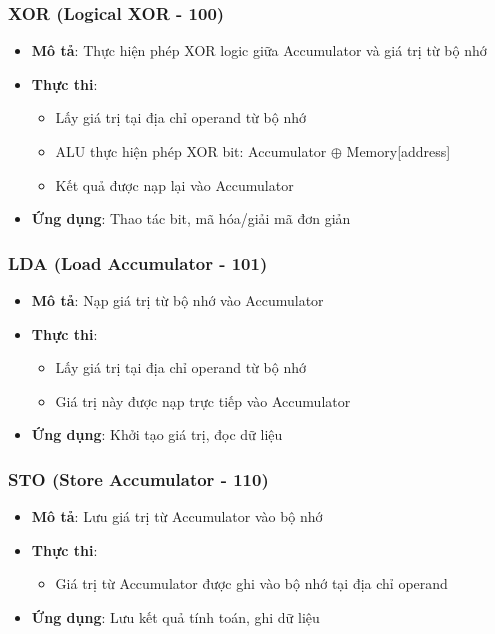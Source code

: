 \subsubsection{XOR (Logical XOR - 100)}
\begin{itemize}
    \item \textbf{Mô tả}: Thực hiện phép XOR logic giữa Accumulator và giá trị từ bộ nhớ
    \item \textbf{Thực thi}:
    \begin{itemize}
        \item Lấy giá trị tại địa chỉ operand từ bộ nhớ
        \item ALU thực hiện phép XOR bit: Accumulator $\oplus$ Memory[address]
        \item Kết quả được nạp lại vào Accumulator
    \end{itemize}
    \item \textbf{Ứng dụng}: Thao tác bit, mã hóa/giải mã đơn giản
\end{itemize}

\subsubsection{LDA (Load Accumulator - 101)}
\begin{itemize}
    \item \textbf{Mô tả}: Nạp giá trị từ bộ nhớ vào Accumulator
    \item \textbf{Thực thi}:
    \begin{itemize}
        \item Lấy giá trị tại địa chỉ operand từ bộ nhớ
        \item Giá trị này được nạp trực tiếp vào Accumulator
    \end{itemize}
    \item \textbf{Ứng dụng}: Khởi tạo giá trị, đọc dữ liệu
\end{itemize}

\subsubsection{STO (Store Accumulator - 110)}
\begin{itemize}
    \item \textbf{Mô tả}: Lưu giá trị từ Accumulator vào bộ nhớ
    \item \textbf{Thực thi}:
    \begin{itemize}
        \item Giá trị từ Accumulator được ghi vào bộ nhớ tại địa chỉ operand
    \end{itemize}
    \item \textbf{Ứng dụng}: Lưu kết quả tính toán, ghi dữ liệu
\end{itemize}

